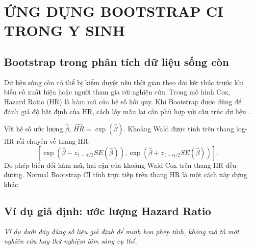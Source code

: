 \section{ỨNG DỤNG BOOTSTRAP CI TRONG Y SINH}

\subsection{Bootstrap trong phân tích dữ liệu sống còn}

Dữ liệu sống còn có thể bị kiểm duyệt nếu thời gian theo dõi kết thúc trước khi biến cố xuất hiện hoặc người tham gia rời nghiên cứu. Trong mô hình Cox, Hazard Ratio (HR) là hàm mũ của hệ số hồi quy. Khi Bootstrap được dùng để đánh giá độ bất định của HR, cách lấy mẫu lại cần phù hợp với cấu trúc dữ liệu \cite{davison1997}.

Với hệ số ước lượng $\widehat{\beta}$, $\widehat{HR}=\exp(\widehat{\beta})$.
Khoảng Wald được tính trên thang log-HR rồi chuyển về thang HR:
\[
\left[
\exp(\widehat{\beta}-z_{1-\alpha/2}SE(\widehat{\beta})),
\exp(\widehat{\beta}+z_{1-\alpha/2}SE(\widehat{\beta}))
\right].
\]
Do phép biến đổi hàm mũ, hai cận của khoảng Wald Cox trên thang HR đều dương.
Normal Bootstrap CI tính trực tiếp trên thang HR là một cách xây dựng khác.

\subsection{Ví dụ giả định: ước lượng Hazard Ratio}

\textit{Ví dụ dưới đây dùng số liệu giả định để minh họa phép tính, không mô tả
một nghiên cứu hay thử nghiệm lâm sàng cụ thể.}

